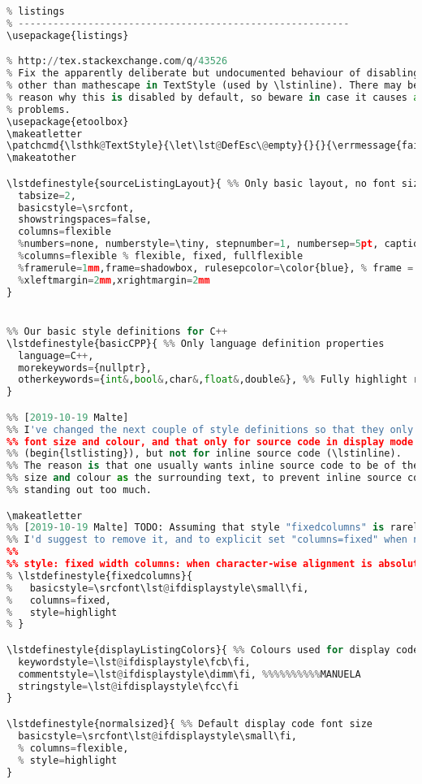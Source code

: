 {\begin{lstlisting}[language=Python,style=normal,escapechar=?,morekeywords={True, False}, mathescape]
% ---------------------------------------------------------
% listings
% ---------------------------------------------------------
\usepackage{listings}

% http://tex.stackexchange.com/q/43526
% Fix the apparently deliberate but undocumented behaviour of disabling escapes
% other than mathescape in TextStyle (used by \lstinline). There may be a good
% reason why this is disabled by default, so beware in case it causes any
% problems.
\usepackage{etoolbox}
\makeatletter
\patchcmd{\lsthk@TextStyle}{\let\lst@DefEsc\@empty}{}{}{\errmessage{failed to patch}}
\makeatother

\lstdefinestyle{sourceListingLayout}{ %% Only basic layout, no font sizes and colours
  tabsize=2,
  basicstyle=\srcfont,
  showstringspaces=false,
  columns=flexible
  %numbers=none, numberstyle=\tiny, stepnumber=1, numbersep=5pt, captionpos=b,
  %columns=flexible % flexible, fixed, fullflexible
  %framerule=1mm,frame=shadowbox, rulesepcolor=\color{blue}, % frame = shadowbox
  %xleftmargin=2mm,xrightmargin=2mm  
}


%% Our basic style definitions for C++ 
\lstdefinestyle{basicCPP}{ %% Only language definition properties
  language=C++,
  morekeywords={nullptr},
  otherkeywords={int&,bool&,char&,float&,double&}, %% Fully highlight reference types
}

%% [2019-10-19 Malte] 
%% I've changed the next couple of style definitions so that they only set
%% font size and colour, and that only for source code in display mode
%% (begin{lstlisting}), but not for inline source code (\lstinline).
%% The reason is that one usually wants inline source code to be of the same
%% size and colour as the surrounding text, to prevent inline source code from
%% standing out too much.

\makeatletter
%% [2019-10-19 Malte] TODO: Assuming that style "fixedcolumns" is rarely used,
%% I'd suggest to remove it, and to explicit set "columns=fixed" when needed.
%%
%% style: fixed width columns: when character-wise alignment is absolutely crucial
% \lstdefinestyle{fixedcolumns}{
%   basicstyle=\srcfont\lst@ifdisplaystyle\small\fi,
%   columns=fixed,
%   style=highlight
% }

\lstdefinestyle{displayListingColors}{ %% Colours used for display code
  keywordstyle=\lst@ifdisplaystyle\fcb\fi,
  commentstyle=\lst@ifdisplaystyle\dimm\fi, %%%%%%%%%%MANUELA
  stringstyle=\lst@ifdisplaystyle\fcc\fi
}

\lstdefinestyle{normalsized}{ %% Default display code font size
  basicstyle=\srcfont\lst@ifdisplaystyle\small\fi,
  % columns=flexible,
  % style=highlight
}


\end{lstlisting}}

